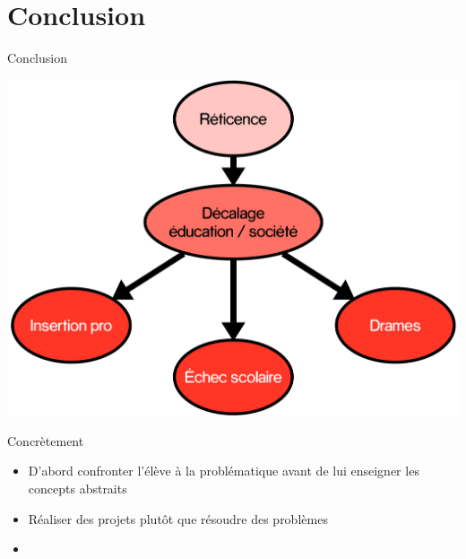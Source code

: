 \section{Conclusion}

\begin{frame}{Conclusion}
   \begin{center}
     \includegraphics[width=.7\textwidth]{../resources/illustrations/ccl}
   \end{center}
\end{frame}

\begin{frame}{Concrètement}
\begin{itemize}
  \item D'abord confronter l'élève à la problématique avant de lui enseigner les concepts abstraits
  \item Réaliser des projets plutôt que résoudre des problèmes
  \item 
\end{itemize}
\end{frame}

